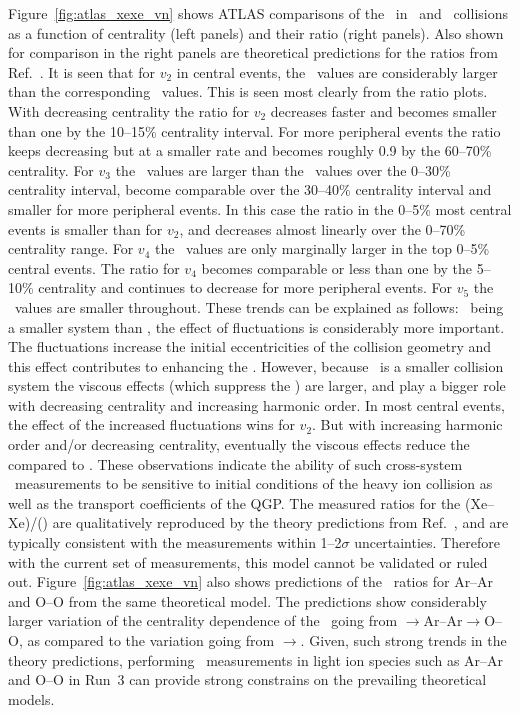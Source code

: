Figure~\ref{fig:atlas_xexe_vn} shows ATLAS comparisons of the \vn\
  in \xexe\ and \pbpb\ collisions as a function of centrality (left panels)
  and their ratio (right panels).
Also shown for comparison in the right panels are theoretical predictions
  for the ratios from Ref.~\cite{Giacalone:2017dud}.
It is seen that for $v_2$ in central events, the \xexe\ values are
  considerably larger than the corresponding \pbpb\ values.
This is seen most clearly from the ratio plots.
With decreasing centrality the ratio for $v_2$ decreases faster and
  becomes smaller than one by the 10--15\% centrality interval.
For more peripheral events the ratio keeps decreasing but at a
  smaller rate and becomes roughly 0.9 by the 60--70\% centrality.
For $v_3$ the \xexe\ values are larger than the \pbpb\ values
  over the 0--30\% centrality interval,  become comparable over the
  30--40\% centrality interval and smaller for more peripheral events.
In this case the ratio in the 0--5\% most central events is smaller
  than for $v_2$, and decreases almost linearly over the 0--70\%
  centrality range.
For $v_4$ the \xexe\ values are only marginally larger in the top
  0--5\% central events.
The ratio for $v_4$ becomes comparable or less than one by the
  5--10\% centrality and continues to decrease for
  more peripheral events.
For $v_5$ the \xexe\ values are smaller throughout.
These trends can be explained as follows:
  \xexe\ being a smaller system than \pbpb, the effect of fluctuations
  is considerably more important.
The fluctuations increase the initial eccentricities of the collision
  geometry and this effect contributes to enhancing the \vn.
However, because \xexe\ is a smaller collision system the viscous
  effects (which suppress the \vn) are larger, and play a bigger role
  with decreasing centrality and increasing harmonic order.
In most central events, the effect of the increased fluctuations wins
  for $v_2$.
But with increasing harmonic order and/or decreasing centrality, 
  eventually the viscous effects reduce the \vn compared to \pbpb.
These observations indicate the ability of such cross-system 
  \vn\ measurements to be sensitive to initial conditions of 
  the heavy ion collision as well as the transport coefficients
  of the QGP. 
The measured ratios for the \vn(Xe--Xe)/\vn(\pbpb) are qualitatively reproduced 
  by the theory predictions from Ref.~\cite{Giacalone:2017dud},
	and are typically consistent with the measurements within 1--2$\sigma$
	uncertainties.
Therefore with the current set of measurements, this model cannot be validated
  or ruled out.
Figure~\ref{fig:atlas_xexe_vn} also shows predictions of the \vn\ ratios
  for Ar--Ar and O--O from the same theoretical model.
The predictions show considerably larger variation of the centrality dependence
  of the \vn\ going from \xexe$\rightarrow$Ar--Ar$\rightarrow$O--O, as compared to
	the variation going from \pbpb$\rightarrow$\xexe.
Given, such strong trends in the theory predictions, performing \vn\ measurements 
  in light ion species such as Ar--Ar and O--O in Run~3 can provide strong 
  constrains on the prevailing theoretical models.

